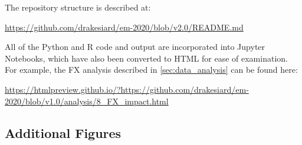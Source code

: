 \documentclass[12pt,a4paper]{article}
\begin{document}
\noindent
The repository structure is described at:

\url{https://github.com/drakesiard/em-2020/blob/v2.0/README.md}

\noindent
All of the Python and R code and output are incorporated into Jupyter Notebooks, which have also been converted to HTML for ease of examination. For example, the FX analysis described in \cref{sec:data_analysis} can be found here:

\begin{adjustbox}{max width=\textwidth}
\url{https://htmlpreview.github.io/?https://github.com/drakesiard/em-2020/blob/v1.0/analysis/8_FX_impact.html}
\end{adjustbox}

\clearpage
\subsection{Additional Figures}\label{sec:graph_appendix}

\listoffigures
\listoftables

\restoregeometry{}
\end{document}
